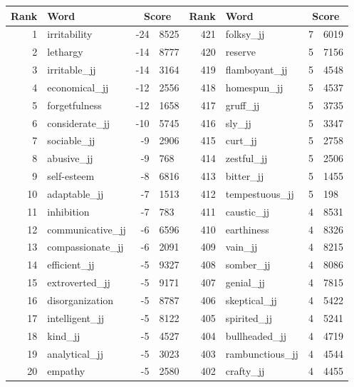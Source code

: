 \begin{table}[tbp]
    \begin{tabular}{| rlr@{.}l | rlr@{.}l |}
    \hline
    \textbf{Rank} & \textbf{Word} & \multicolumn{2}{c|}{\textbf{Score}} & \textbf{Rank} & \textbf{Word} & \multicolumn{2}{c|}{\textbf{Score}} \\
    \hline
    1 & irritability & -24 & 8525    &    421 & folksy\_jj & 7 & 6019 \\
    2 & lethargy & -14 & 8777    &    420 & reserve & 5 & 7156 \\
    3 & irritable\_jj & -14 & 3164    &    419 & flamboyant\_jj & 5 & 4548 \\
    4 & economical\_jj & -12 & 2556    &    418 & homespun\_jj & 5 & 4537 \\
    5 & forgetfulness & -12 & 1658    &    417 & gruff\_jj & 5 & 3735 \\
    6 & considerate\_jj & -10 & 5745    &    416 & sly\_jj & 5 & 3347 \\
    7 & sociable\_jj & -9 & 2906    &    415 & curt\_jj & 5 & 2758 \\
    8 & abusive\_jj & -9 & 768    &    414 & zestful\_jj & 5 & 2506 \\
    9 & self-esteem & -8 & 6816    &    413 & bitter\_jj & 5 & 1455 \\
    10 & adaptable\_jj & -7 & 1513    &    412 & tempestuous\_jj & 5 & 198 \\
    11 & inhibition & -7 & 783    &    411 & caustic\_jj & 4 & 8531 \\
    12 & communicative\_jj & -6 & 6596    &    410 & earthiness & 4 & 8326 \\
    13 & compassionate\_jj & -6 & 2091    &    409 & vain\_jj & 4 & 8215 \\
    14 & efficient\_jj & -5 & 9327    &    408 & somber\_jj & 4 & 8086 \\
    15 & extroverted\_jj & -5 & 9171    &    407 & genial\_jj & 4 & 7815 \\
    16 & disorganization & -5 & 8787    &    406 & skeptical\_jj & 4 & 5422 \\
    17 & intelligent\_jj & -5 & 8122    &    405 & spirited\_jj & 4 & 5241 \\
    18 & kind\_jj & -5 & 4527    &    404 & bullheaded\_jj & 4 & 4719 \\
    19 & analytical\_jj & -5 & 3023    &    403 & rambunctious\_jj & 4 & 4544 \\
    20 & empathy & -5 & 2580    &    402 & crafty\_jj & 4 & 4455 \\

\end{tabular}
\end{table}
